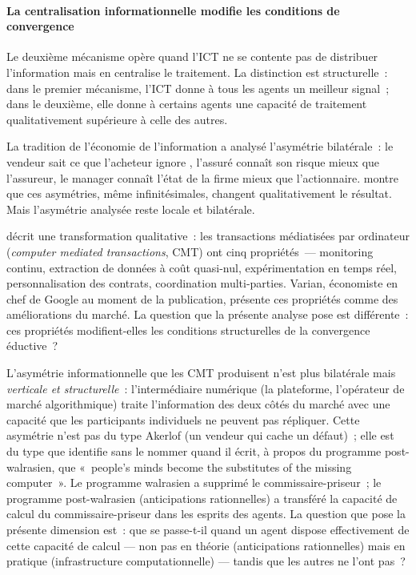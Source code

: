 \paragraph{La centralisation informationnelle modifie les conditions de convergence}

Le deuxième mécanisme opère quand l'ICT ne se contente pas de distribuer l'information mais en centralise le traitement. La distinction est structurelle~: dans le premier mécanisme, l'ICT donne à tous les agents un meilleur signal~; dans le deuxième, elle donne à certains agents une capacité de traitement qualitativement supérieure à celle des autres.

La tradition de l'économie de l'information a analysé l'asymétrie bilatérale~: le vendeur sait ce que l'acheteur ignore \parencite{akerlof_lemons_1970}, l'assuré connaît son risque mieux que l'assureur, le manager connaît l'état de la firme mieux que l'actionnaire. \textcite{stiglitz_contributions_2000} montre que ces asymétries, même infinitésimales, changent qualitativement le résultat. Mais l'asymétrie analysée reste locale et bilatérale.

\textcite{varian_computer_2010} décrit une transformation qualitative~: les transactions médiatisées par ordinateur (\emph{computer mediated transactions}, CMT) ont cinq propriétés~--- monitoring continu, extraction de données à coût quasi-nul, expérimentation en temps réel, personnalisation des contrats, coordination multi-parties. Varian, économiste en chef de Google au moment de la publication, présente ces propriétés comme des améliorations du marché. La question que la présente analyse pose est différente~: ces propriétés modifient-elles les conditions structurelles de la convergence éductive~?

L'asymétrie informationnelle que les CMT produisent n'est plus bilatérale mais \emph{verticale et structurelle}~: l'intermédiaire numérique (la plateforme, l'opérateur de marché algorithmique) traite l'information des deux côtés du marché avec une capacité que les participants individuels ne peuvent pas répliquer. Cette asymétrie n'est pas du type Akerlof (un vendeur qui cache un défaut)~; elle est du type que \textcite{guesnerie_modernity_2011} identifie sans le nommer quand il écrit, à propos du programme post-walrasien, que «~people's minds become the substitutes of the missing computer~». Le programme walrasien a supprimé le commissaire-priseur~; le programme post-walrasien (anticipations rationnelles) a transféré la capacité de calcul du commissaire-priseur dans les esprits des agents. La question que pose la présente dimension est~: que se passe-t-il quand un agent dispose effectivement de cette capacité de calcul --- non pas en théorie (anticipations rationnelles) mais en pratique (infrastructure computationnelle) --- tandis que les autres ne l'ont pas~?

